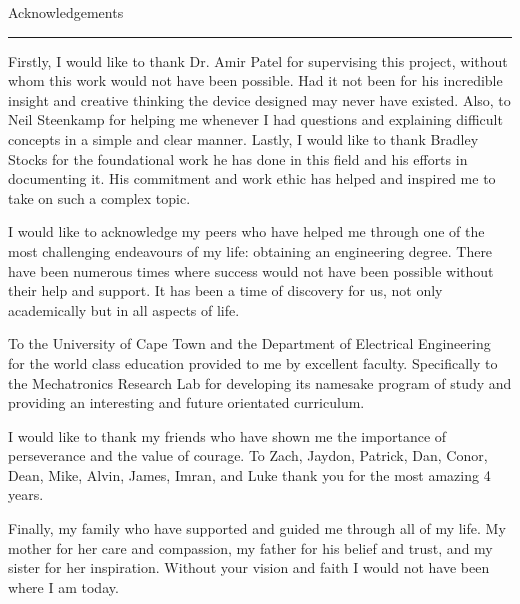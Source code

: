 \thispagestyle{plain}


{\Large Acknowledgements}
\vskip 5mm
\hrule
\vskip 5mm

Firstly, I would like to thank Dr. Amir Patel for supervising this project, without whom this work would not have been possible. Had it not been for his incredible insight and creative thinking the device designed may never have existed. Also, to Neil Steenkamp for helping me whenever I had questions and explaining difficult concepts in a simple and clear manner. Lastly, I would like to thank Bradley Stocks for the foundational work he has done in this field and his efforts in documenting it. His commitment and work ethic has helped and inspired me to take on such a complex topic.

I would like to acknowledge my peers who have helped me through one of the most challenging endeavours of my life: obtaining an engineering degree. There have been numerous times where success would not have been possible without their help and support. It has been a time of discovery for us, not only academically but in all aspects of life.

To the University of Cape Town and the Department of Electrical Engineering for the world class education provided to me by excellent faculty. Specifically to the Mechatronics Research Lab for developing its namesake program of study and providing an interesting and future orientated curriculum. 

I would like to thank my friends who have shown me the importance of perseverance and the value of courage. To Zach, Jaydon, Patrick, Dan, Conor, Dean, Mike, Alvin, James, Imran, and Luke thank you for the most amazing 4 years.

Finally, my family who have supported and guided me through all of my life. My mother for her care and compassion, my father for his belief and trust, and my sister for her inspiration. Without your vision and faith I would not have been where I am today. 

 





